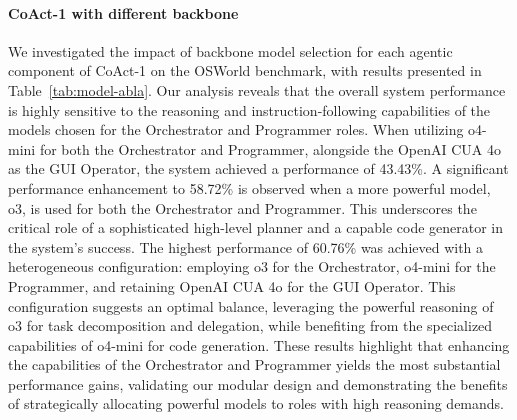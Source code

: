 \documentclass{article} %
\newcommand{\ours}{CoAct-1\xspace}
\begin{document}
\paragraph{\ours with different backbone}
\begin{table}[t]
\centering
\caption{\label{tab:model-abla}Performance of \ours with different backbone model for each participant agent. Powerful Orchestrator significantly help improve the performance on OSWorld.}
\renewcommand{\arraystretch}{1.2}
\end{table}
We investigated the impact of backbone model selection for each agentic component of \ours on the OSWorld benchmark, with results presented in Table~\ref{tab:model-abla}. Our analysis reveals that the overall system performance is highly sensitive to the reasoning and instruction-following capabilities of the models chosen for the Orchestrator and Programmer roles. When utilizing o4-mini for both the Orchestrator and Programmer, alongside the OpenAI CUA 4o as the GUI Operator, the system achieved a performance of 43.43\%. A significant performance enhancement to 58.72\% is observed when a more powerful model, o3, is used for both the Orchestrator and Programmer. This underscores the critical role of a sophisticated high-level planner and a capable code generator in the system's success. The highest performance of 60.76\% was achieved with a heterogeneous configuration: employing o3 for the Orchestrator, o4-mini for the Programmer, and retaining OpenAI CUA 4o for the GUI Operator. This configuration suggests an optimal balance, leveraging the powerful reasoning of o3 for task decomposition and delegation, while benefiting from the specialized capabilities of o4-mini for code generation. These results highlight that enhancing the capabilities of the Orchestrator and Programmer yields the most substantial performance gains, validating our modular design and demonstrating the benefits of strategically allocating powerful models to roles with high reasoning demands.
\end{document}
